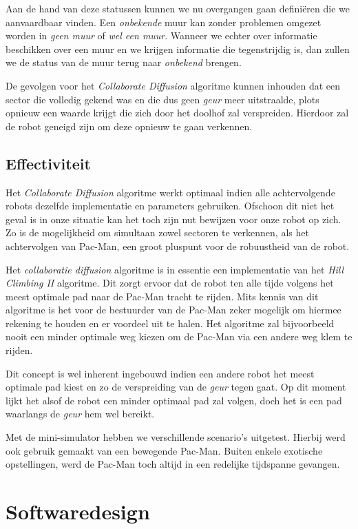 \documentclass[12pt,a4paper]{report}
\begin{document}
Aan de hand van deze statussen kunnen we nu overgangen gaan defini\"eren die we aanvaardbaar vinden. Een \emph{onbekende} muur kan zonder problemen omgezet worden in \emph{geen muur} of \emph{wel een muur}. Wanneer we echter over informatie beschikken over een muur en we krijgen informatie die tegenstrijdig is, dan zullen we de status van de muur terug naar \emph{onbekend} brengen.

De gevolgen voor het \emph{Collaborate Diffusion} algoritme kunnen inhouden dat een sector die volledig gekend was en die dus geen \emph{geur} meer uitstraalde, plots opnieuw een waarde krijgt die zich door het doolhof zal verspreiden. Hierdoor zal de robot geneigd zijn om deze opnieuw te gaan verkennen.

\section{Effectiviteit}

Het \emph{Collaborate Diffusion} algoritme werkt optimaal indien alle achtervolgende robots dezelfde implementatie en parameters gebruiken. Ofschoon dit niet het geval is in onze situatie kan het toch zijn nut bewijzen voor onze robot op zich. Zo is de mogelijkheid om simultaan zowel sectoren te verkennen, als het achtervolgen van Pac-Man, een groot pluspunt voor de robuustheid van de robot.

Het \emph{collaboratie diffusion} algoritme is in essentie een implementatie van het \emph{Hill Climbing II} algoritme. Dit zorgt ervoor dat de robot ten alle tijde volgens het meest optimale pad naar de Pac-Man tracht te rijden. Mits kennis van dit algoritme is het voor de bestuurder van de Pac-Man zeker mogelijk om hiermee rekening te houden en er voordeel uit te halen. Het algoritme zal bijvoorbeeld nooit een minder optimale weg kiezen om de Pac-Man via een andere weg klem te rijden.

Dit concept is wel inherent ingebouwd indien een andere robot het meest optimale pad kiest en zo de verspreiding van de \emph{geur} tegen gaat. Op dit moment lijkt het alsof de robot een minder optimaal pad zal volgen, doch het is een pad waarlangs de \emph{geur} hem wel bereikt.

Met de mini-simulator hebben we verschillende scenario's uitgetest. Hierbij werd ook gebruik gemaakt van een bewegende Pac-Man. Buiten enkele exotische opstellingen, werd de Pac-Man toch altijd in een redelijke tijdspanne gevangen.

\chapter{Softwaredesign}
\end{document}
